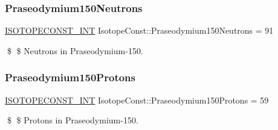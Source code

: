 \subsubsection{\texorpdfstring{Praseodymium150\+Neutrons}{Praseodymium150Neutrons}}
{\footnotesize\ttfamily \mbox{\hyperlink{group___isotope_const-_macros_ga5f18360b3e99483a35c32d789e62621c}{I\+S\+O\+T\+O\+P\+E\+C\+O\+N\+S\+T\+\_\+\+I\+NT}} Isotope\+Const\+::\+Praseodymium150\+Neutrons = 91}

\$ \$ Neutrons in Praseodymium-\/150. \mbox{\label{group___isotope_const-_praseodymium-_pr150_ga8b6cdbec4ad836fe93ed1d77fdd4ee84}} 
\subsubsection{\texorpdfstring{Praseodymium150\+Protons}{Praseodymium150Protons}}
{\footnotesize\ttfamily \mbox{\hyperlink{group___isotope_const-_macros_ga5f18360b3e99483a35c32d789e62621c}{I\+S\+O\+T\+O\+P\+E\+C\+O\+N\+S\+T\+\_\+\+I\+NT}} Isotope\+Const\+::\+Praseodymium150\+Protons = 59}

\$ \$ Protons in Praseodymium-\/150. 